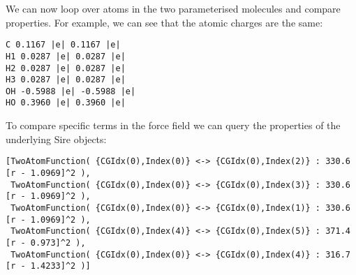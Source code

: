 We can now loop over atoms in the two parameterised molecules and
compare properties. For example, we can see that the atomic charges are
the same:

\begin{Shaded}
\begin{Highlighting}[]
 
\end{Highlighting}
\end{Shaded}

\begin{verbatim}
C 0.1167 |e| 0.1167 |e|
H1 0.0287 |e| 0.0287 |e|
H2 0.0287 |e| 0.0287 |e|
H3 0.0287 |e| 0.0287 |e|
OH -0.5988 |e| -0.5988 |e|
HO 0.3960 |e| 0.3960 |e|
\end{verbatim}

To compare specific terms in the force field we can query the properties
of the underlying Sire objects:

\begin{Shaded}
\begin{Highlighting}[]
\NormalTok{(}
\end{Highlighting}
\end{Shaded}

\begin{verbatim}
[TwoAtomFunction( {CGIdx(0),Index(0)} <-> {CGIdx(0),Index(2)} : 330.6 [r - 1.0969]^2 ),
 TwoAtomFunction( {CGIdx(0),Index(0)} <-> {CGIdx(0),Index(3)} : 330.6 [r - 1.0969]^2 ),
 TwoAtomFunction( {CGIdx(0),Index(0)} <-> {CGIdx(0),Index(1)} : 330.6 [r - 1.0969]^2 ),
 TwoAtomFunction( {CGIdx(0),Index(4)} <-> {CGIdx(0),Index(5)} : 371.4 [r - 0.973]^2 ),
 TwoAtomFunction( {CGIdx(0),Index(0)} <-> {CGIdx(0),Index(4)} : 316.7 [r - 1.4233]^2 )]
\end{verbatim}

\begin{Shaded}
\begin{Highlighting}[]
\NormalTok{(}
\end{Highlighting}
\end{Shaded}

